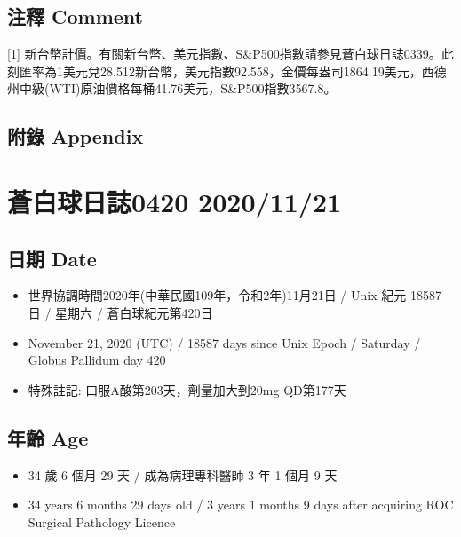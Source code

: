 \documentclass[a5paper, 11pt
]{book}
\providecommand{\tightlist}{%
  \setlength{\itemsep}{0pt}\setlength{\parskip}{0pt}}
\begin{document}
\hypertarget{ux6ce8ux91cb-comment-72}{%
\subsection{注釋 Comment}\label{ux6ce8ux91cb-comment-72}}

{[}1{]}
新台幣計價。有關新台幣、美元指數、S\&P500指數請參見蒼白球日誌0339。此刻匯率為1美元兌28.512新台幣，美元指數92.558，金價每盎司1864.19美元，西德州中級(WTI)原油價格每桶41.76美元，S\&P500指數3567.8。

\hypertarget{ux9644ux9304-appendix-72}{%
\subsection{附錄 Appendix}\label{ux9644ux9304-appendix-72}}

\hypertarget{ux84bcux767dux7403ux65e5ux8a8c0420-20201121}{%
\section{蒼白球日誌0420
2020/11/21}\label{ux84bcux767dux7403ux65e5ux8a8c0420-20201121}}

\hypertarget{ux65e5ux671f-date-73}{%
\subsection{日期 Date}\label{ux65e5ux671f-date-73}}

\begin{itemize}
\tightlist
\item
  世界協調時間2020年(中華民國109年，令和2年)11月21日 / Unix 紀元 18587
  日 / 星期六 / 蒼白球紀元第420日
\item
  November 21, 2020 (UTC) / 18587 days since Unix Epoch / Saturday /
  Globus Pallidum day 420
\item
  特殊註記: 口服A酸第203天，劑量加大到20mg QD第177天
\end{itemize}

\hypertarget{ux5e74ux9f61-age-73}{%
\subsection{年齡 Age}\label{ux5e74ux9f61-age-73}}

\begin{itemize}
\tightlist
\item
  34 歲 6 個月 29 天 / 成為病理專科醫師 3 年 1 個月 9 天
\item
  34 years 6 months 29 days old / 3 years 1 months 9 days after
  acquiring ROC Surgical Pathology Licence
\end{itemize}
\end{document}
